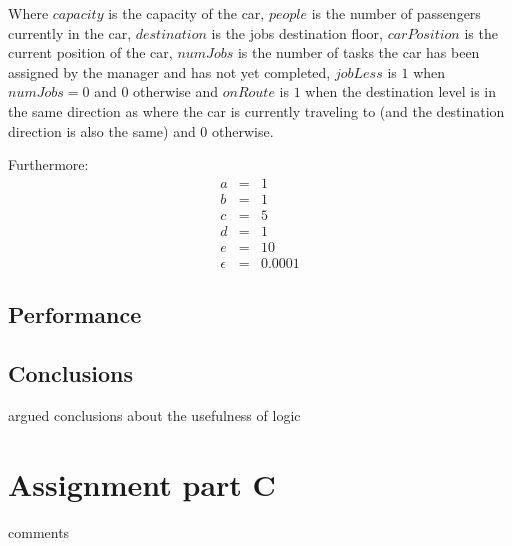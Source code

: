\documentclass[a4paper,11pt]{article}
\begin{document}
Where $capacity$ is the capacity of the car, $people$ is the number of passengers currently in the car, $destination$ is the jobs destination floor, $carPosition$ is the current position of the car, $numJobs$ is the number of tasks the car has been assigned by the manager and has not yet completed, $jobLess$ is $1$ when $numJobs = 0$  and $0$ otherwise and $onRoute$ is $1$ when the destination level is in the same direction as where the car is currently traveling to (and the destination direction is also the same) and $0$ otherwise.

Furthermore: \[\begin{array}{lcl}
a & = & 1\\
b & = & 1\\
c & = & 5\\
d & = & 1\\
e & = & 10\\
\epsilon & = & 0.0001
\end{array}\]

\subsection{Performance}

\subsection{Conclusions}
argued conclusions about the usefulness of logic

\section{Assignment part C}

comments
\end{document}

